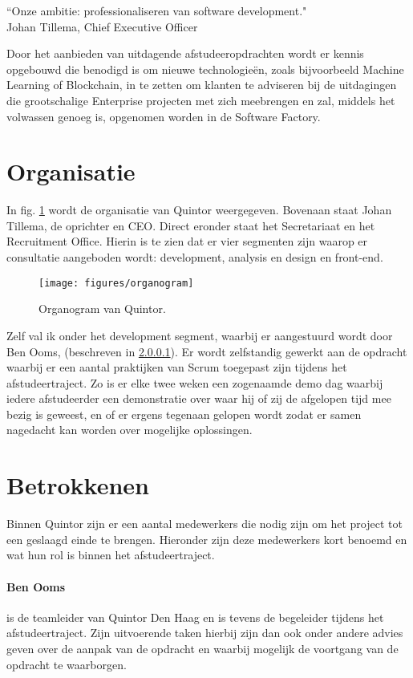 \begin{formal}
  \label{visie}
  ``Onze ambitie: professionaliseren van software development."
  \\ Johan Tillema, Chief Executive Officer
\end{formal}

Door het aanbieden van uitdagende afstudeeropdrachten wordt er kennis opgebouwd die benodigd is om nieuwe technologieën, zoals bijvoorbeeld Machine Learning of Blockchain, in te zetten om klanten te adviseren bij de uitdagingen die grootschalige Enterprise projecten met zich meebrengen en zal, middels het volwassen genoeg is, opgenomen worden in de Software Factory.

\section{Organisatie}
In fig. \ref{organogram} wordt de organisatie van Quintor weergegeven. Bovenaan staat Johan Tillema, de oprichter en CEO. Direct eronder staat het Secretariaat en het Recruitment Office. Hierin is te zien dat er vier segmenten zijn waarop er consultatie aangeboden wordt: development, analysis en design en front-end.

\begin{figure}[h]
  \texttt{[image: figures/organogram]}
  \caption{Organogram van Quintor.}
  \label{organogram}
\end{figure}

\newpage
Zelf val ik onder het development segment, waarbij er aangestuurd wordt door Ben Ooms, (beschreven in \ref{begeleider}). Er wordt zelfstandig gewerkt aan de opdracht waarbij er een aantal praktijken van Scrum toegepast zijn tijdens het afstudeertraject. Zo is er elke twee weken een zogenaamde demo dag waarbij iedere afstudeerder een demonstratie over waar hij of zij de afgelopen tijd mee bezig is geweest, en of er ergens tegenaan gelopen wordt zodat er samen nagedacht kan worden over mogelijke oplossingen.

\section{Betrokkenen}

Binnen Quintor zijn er een aantal medewerkers die nodig zijn om het project tot een geslaagd einde te brengen. Hieronder zijn deze medewerkers kort benoemd en wat hun rol is binnen het afstudeertraject.

\paragraph{Ben Ooms} \label{begeleider} is de teamleider van Quintor Den Haag en is tevens de begeleider tijdens het afstudeertraject. Zijn uitvoerende taken hierbij zijn dan ook onder andere advies geven over de aanpak van de opdracht en waarbij mogelijk de voortgang van de opdracht te waarborgen.

